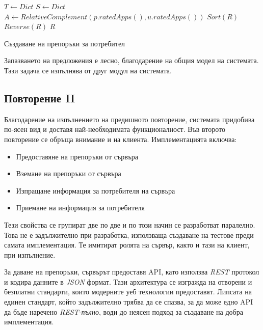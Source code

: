 		\begin{algorithm}[h]
			\label{algorithm:get-recommendations}
			$T \longleftarrow Dict $\;
			$S \longleftarrow Dict $\;
			$A \longleftarrow RelativeComplement(p.ratedApps(), u.ratedApps())$\;
			$Sort(R)$\;
			$Reverse(R)$\;
			\Return $R$\;
			\caption{Създаване на препоръки за потребител}
		\end{algorithm}
		
		Запазването на предложения е лесно, благодарение на общия модел на системата. Тази задача се изпълнява от друг модул на системата.
		
		\subsection{Повторение II}
		
		Благодарение на изпълнението на предишното повторение, системата придобива по-ясен вид и доставя най-необходимата функционалност. Във второто повторение се обръща внимание и на клиента. Имплементацията включва:
		
		\begin{itemize}
			\item Предоставяне на препоръки от сървъра
			\item Вземане на препоръки от сървъра
			\item Изпращане информация за потребителя на сървъра
			\item Приемане на информация за потребителя
		\end{itemize}
		
		Тези свойства се групират две по две и по този начин се разработват паралелно. Това не е задължително при разработка, използваща създаване на тестове преди самата имплементация. Те имитират ролята на сървър, както и тази на клиент, при изпълнение.
		
		За даване на препоръки, сървърът предоставя \ac{API}, като използва \emph{REST} протокол и кодира данните в \emph{JSON} формат. Тази архитектура се изгражда на отворени и безплатни стандарти, които модерните уеб технологии предоставят. Липсата на единен стандарт, който задължително трябва да се спазва, за да може едно \ac{API} да бъде наречено \emph{REST-пълно}, води до неясен подход за създаване на добра имплементация.
		
